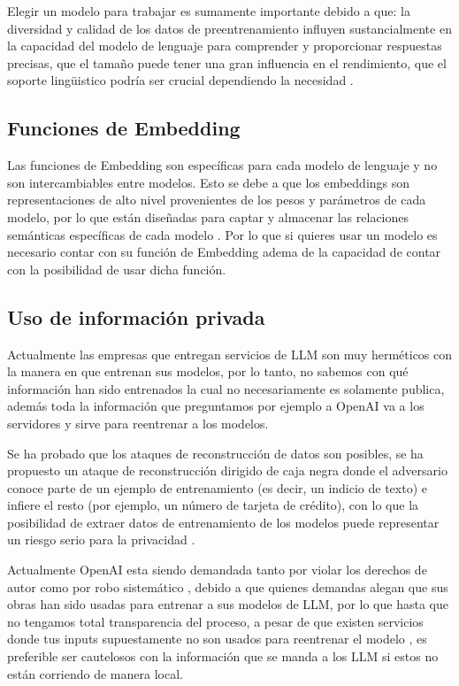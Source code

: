 Elegir un modelo para trabajar es sumamente importante debido a que: la diversidad y calidad de los datos de preentrenamiento influyen 
sustancialmente en la capacidad del modelo de lenguaje para comprender y proporcionar respuestas precisas, que el tamaño puede tener una 
gran influencia en el rendimiento, que el soporte lingüistico podría ser crucial dependiendo la necesidad \cite{modelos1}.

\subsection{Funciones de Embedding}

Las funciones de Embedding son específicas para cada modelo de lenguaje y no son intercambiables entre modelos. Esto se debe a que los embeddings son 
representaciones de alto nivel provenientes de los pesos y parámetros de cada modelo, por lo que están diseñadas para captar y almacenar las relaciones 
semánticas específicas de cada modelo \cite{microsoft1}. Por lo que si quieres usar un modelo es necesario contar con su función de Embedding adema de la capacidad de contar con la posibilidad de usar dicha función. 


\subsection{Uso de información privada}

Actualmente las empresas que entregan servicios de LLM son muy herméticos con la manera en que entrenan sus modelos, por lo tanto, no sabemos 
con qué información han sido entrenados la cual no necesariamente es solamente publica, además toda la información que preguntamos por ejemplo a 
OpenAI va a los servidores y sirve para reentrenar a los modelos.

Se ha probado que los ataques de reconstrucción de datos son posibles, se ha propuesto un ataque de reconstrucción dirigido de caja negra donde el 
adversario conoce parte de un ejemplo de entrenamiento (es decir, un indicio de texto) e infiere el resto (por ejemplo, un número de tarjeta de crédito), 
con lo que la posibilidad de extraer datos de entrenamiento de los modelos puede representar un riesgo serio para la privacidad \cite{privacidad1}. 

Actualmente OpenAI esta siendo demandada tanto por violar los derechos de autor \cite{privacidad3} como por robo sistemático \cite{privacidad2}, debido a que quienes 
demandas alegan que sus obras han sido usadas para entrenar a sus modelos de LLM, por lo que hasta que no tengamos total transparencia del proceso, 
a pesar de que existen servicios donde tus inputs supuestamente no son usados para reentrenar el modelo \cite{openai4}, es preferible ser cautelosos con la 
información que se manda a los LLM si estos no están corriendo de manera local.





